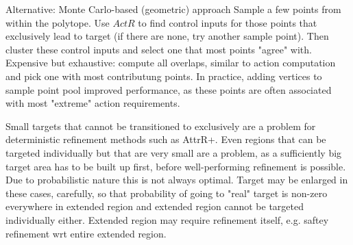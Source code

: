    Alternative: Monte Carlo-based (geometric) approach
    Sample a few points from within the polytope.
    Use $ActR$ to find control inputs for those points that exclusively lead to target (if there are none, try another sample point).
    Then cluster these control inputs and select one that most points "agree" with.
    Expensive but exhaustive: compute all overlaps, similar to action computation and pick one with most contributung points.
    In practice, adding vertices to sample point pool improved performance, as these points are often associated with most "extreme" action requirements.

    Small targets that cannot be transitioned to exclusively are a problem for deterministic refinement methods such as AttrR+.
    Even regions that can be targeted individually but that are very small are a problem, as a sufficiently big target area has to be built up first, before well-performing refinement is possible.
    Due to probabilistic nature this is not always optimal.
    Target may be enlarged in these cases, carefully, so that probability of going to "real" target is non-zero everywhere in extended region and extended region cannot be targeted individually either.
    Extended region may require refinement itself, e.g. saftey refinement wrt entire extended region.


\stopsubsection

